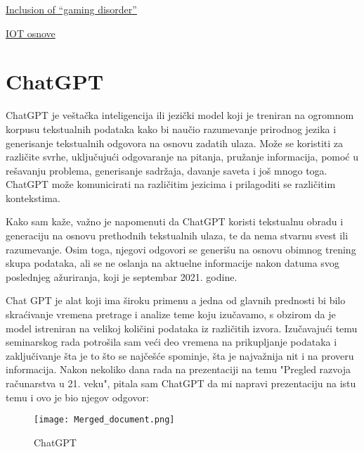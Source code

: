 \documentclass[a4paper]{article}
\begin{document}
{\begin{thebibliography}{Literatura}
        \href{https://www.who.int/news/item/14-09-2018-inclusion-of-gaming-disorder-in-icd-11}{Inclusion of “gaming disorder”}

        \href{https://samoobrazovanje.rs/sta-je-internet-of-things-internet-inteligentnih-uredjaja/}{IOT osnove}
\end{thebibliography}
\newpage

\appendix
\section{ChatGPT}

ChatGPT je veštačka inteligencija ili jezički model koji je treniran na ogromnom korpusu tekstualnih podataka kako bi naučio razumevanje prirodnog jezika i generisanje tekstualnih odgovora na osnovu zadatih ulaza. Može se koristiti za različite svrhe, uključujući odgovaranje na pitanja, pružanje informacija, pomoć u rešavanju problema, generisanje sadržaja, davanje saveta i još mnogo toga. ChatGPT može komunicirati na različitim jezicima i prilagoditi se različitim kontekstima. 

Kako sam kaže, važno je napomenuti da ChatGPT koristi tekstualnu obradu i generaciju na osnovu prethodnih tekstualnih ulaza, te da nema stvarnu svest ili razumevanje. Osim toga, njegovi odgovori se generišu na osnovu obimnog trening skupa podataka, ali se ne oslanja na aktuelne informacije nakon datuma svog poslednjeg ažuriranja, koji je septembar 2021. godine.

Chat GPT je alat koji ima široku primenu a jedna od glavnih prednosti bi bilo skraćivanje vremena pretrage i analize teme koju izučavamo, s obzirom da je model istreniran na velikoj količini podataka iz različitih izvora. Izučavajući temu seminarskog rada potrošila sam veći deo vremena na prikupljanje podataka i zaključivanje šta je to što se najčešće spominje, šta je najvažnija nit i na proveru informacija. Nakon nekoliko dana rada na prezentaciji na temu "Pregled razvoja računarstva u 21. veku", pitala sam ChatGPT da mi napravi prezentaciju na istu temu i ovo je bio njegov odgovor:

\begin{figure}[H]
\texttt{[image: Merged\_document.png]}
\caption{ChatGPT}
\label{fig:kvant}
\end{figure}

}
\end{document}
